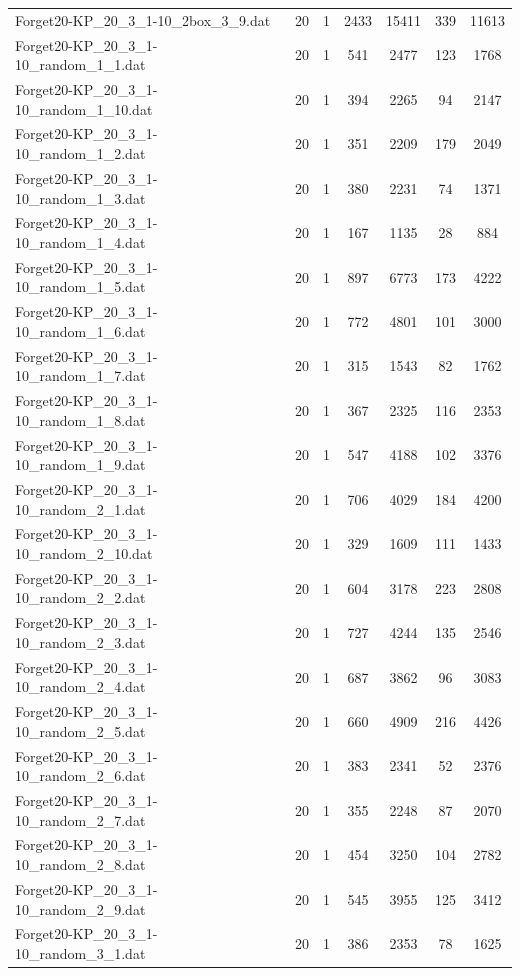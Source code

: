 \begin{table}[!ht]
\begin{tabular}{lcccccc}
Forget20-KP\_20\_3\_1-10\_2box\_3\_9.dat & 20 & 1 & 2433 & 15411 & 339 & 11613 \\
Forget20-KP\_20\_3\_1-10\_random\_1\_1.dat & 20 & 1 & 541 & 2477 & 123 & 1768 \\
Forget20-KP\_20\_3\_1-10\_random\_1\_10.dat & 20 & 1 & 394 & 2265 & 94 & 2147 \\
Forget20-KP\_20\_3\_1-10\_random\_1\_2.dat & 20 & 1 & 351 & 2209 & 179 & 2049 \\
Forget20-KP\_20\_3\_1-10\_random\_1\_3.dat & 20 & 1 & 380 & 2231 & 74 & 1371 \\
Forget20-KP\_20\_3\_1-10\_random\_1\_4.dat & 20 & 1 & 167 & 1135 & 28 & 884 \\
Forget20-KP\_20\_3\_1-10\_random\_1\_5.dat & 20 & 1 & 897 & 6773 & 173 & 4222 \\
Forget20-KP\_20\_3\_1-10\_random\_1\_6.dat & 20 & 1 & 772 & 4801 & 101 & 3000 \\
Forget20-KP\_20\_3\_1-10\_random\_1\_7.dat & 20 & 1 & 315 & 1543 & 82 & 1762 \\
Forget20-KP\_20\_3\_1-10\_random\_1\_8.dat & 20 & 1 & 367 & 2325 & 116 & 2353 \\
Forget20-KP\_20\_3\_1-10\_random\_1\_9.dat & 20 & 1 & 547 & 4188 & 102 & 3376 \\
Forget20-KP\_20\_3\_1-10\_random\_2\_1.dat & 20 & 1 & 706 & 4029 & 184 & 4200 \\
Forget20-KP\_20\_3\_1-10\_random\_2\_10.dat & 20 & 1 & 329 & 1609 & 111 & 1433 \\
Forget20-KP\_20\_3\_1-10\_random\_2\_2.dat & 20 & 1 & 604 & 3178 & 223 & 2808 \\
Forget20-KP\_20\_3\_1-10\_random\_2\_3.dat & 20 & 1 & 727 & 4244 & 135 & 2546 \\
Forget20-KP\_20\_3\_1-10\_random\_2\_4.dat & 20 & 1 & 687 & 3862 & 96 & 3083 \\
Forget20-KP\_20\_3\_1-10\_random\_2\_5.dat & 20 & 1 & 660 & 4909 & 216 & 4426 \\
Forget20-KP\_20\_3\_1-10\_random\_2\_6.dat & 20 & 1 & 383 & 2341 & 52 & 2376 \\
Forget20-KP\_20\_3\_1-10\_random\_2\_7.dat & 20 & 1 & 355 & 2248 & 87 & 2070 \\
Forget20-KP\_20\_3\_1-10\_random\_2\_8.dat & 20 & 1 & 454 & 3250 & 104 & 2782 \\
Forget20-KP\_20\_3\_1-10\_random\_2\_9.dat & 20 & 1 & 545 & 3955 & 125 & 3412 \\
Forget20-KP\_20\_3\_1-10\_random\_3\_1.dat & 20 & 1 & 386 & 2353 & 78 & 1625 \\

\end{tabular}
\end{table}
